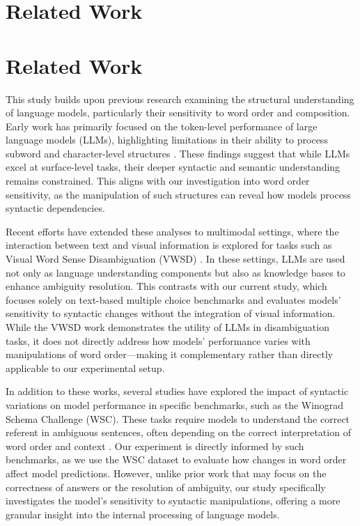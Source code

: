 \documentclass{article}
\begin{document}
\section{Related Work}
\section{Related Work}

This study builds upon previous research examining the structural understanding of language models, particularly their sensitivity to word order and composition. Early work has primarily focused on the token-level performance of large language models (LLMs), highlighting limitations in their ability to process subword and character-level structures \cite{2405.11357v3}. These findings suggest that while LLMs excel at surface-level tasks, their deeper syntactic and semantic understanding remains constrained. This aligns with our investigation into word order sensitivity, as the manipulation of such structures can reveal how models process syntactic dependencies.

Recent efforts have extended these analyses to multimodal settings, where the interaction between text and visual information is explored for tasks such as Visual Word Sense Disambiguation (VWSD) \cite{2310.14025v1}. In these settings, LLMs are used not only as language understanding components but also as knowledge bases to enhance ambiguity resolution. This contrasts with our current study, which focuses solely on text-based multiple choice benchmarks and evaluates models' sensitivity to syntactic changes without the integration of visual information. While the VWSD work demonstrates the utility of LLMs in disambiguation tasks, it does not directly address how models' performance varies with manipulations of word order—making it complementary rather than directly applicable to our experimental setup.

In addition to these works, several studies have explored the impact of syntactic variations on model performance in specific benchmarks, such as the Winograd Schema Challenge (WSC). These tasks require models to understand the correct referent in ambiguous sentences, often depending on the correct interpretation of word order and context \cite{winograd}. Our experiment is directly informed by such benchmarks, as we use the WSC dataset to evaluate how changes in word order affect model predictions. However, unlike prior work that may focus on the correctness of answers or the resolution of ambiguity, our study specifically investigates the model's sensitivity to syntactic manipulations, offering a more granular insight into the internal processing of language models.
\end{document}
